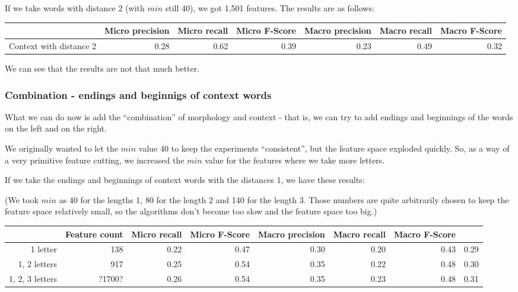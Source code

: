 \documentclass[letterpaper]{article}
\begin{document}
If we take words with distance 2 (with $min$ still 40), we got 1,501 features. The results are as follows:

\begin{tabular}{|r|r|r|r|r|r|r|}
 \hline
 & \textbf{Micro precision} &  \textbf{Micro recall}  &  \textbf{Micro F-Score} & \textbf{Macro precision} &  \textbf{Macro recall}  &  \textbf{Macro F-Score} \\ \hline
Context with distance 2 & 0.28 & 0.62 & 0.39 & 0.23 & 0.49 & 0.32 \\ \hline
\end{tabular}

We can see that the results are not that much better.

\subsubsection{Combination - endings and beginnigs of context words}
What we can do now is add the ``combination'' of morphology and context - that is, we can try to add endings and beginnings of the words on the left and on the right.

We originally wanted to let the $min$ value 40 to keep the experiments ``consistent'', but the feature space exploded quickly. So, as a way of a very primitive feature cutting, we increased the $min$ value for the features where we take more letters.

If we take the endings and beginnings of context words with the distances 1, we have these results:

(We took $min$ as 40 for the lengths 1, 80 for the length 2 and 140 for the length 3. Those numbers are quite arbitrarily chosen to keep the feature space relatively small, so the algorithms don't become too slow and the feature space too big.)

\begin{tabular}{|r|r|r|r|r|r|r|r|}
     & \textbf{Feature count} &  \textbf{Micro recall}  &  \textbf{Micro F-Score} & \textbf{Macro precision} &  \textbf{Macro recall}  &  \textbf{Macro F-Score} \\ \hline
1 letter & 138 & 0.22 & 0.47 & 0.30 & 0.20 & 0.43 & 0.29 \\ \hline
1, 2 letters & 917 & 0.25 & 0.54 & 0.35 & 0.22 & 0.48 & 0.30 \\ \hline
1, 2, 3 letters & ?1700? & 0.26 & 0.54 & 0.35 & 0.23 & 0.48 & 0.31 \\ \hline

\end{tabular}
\end{document}
